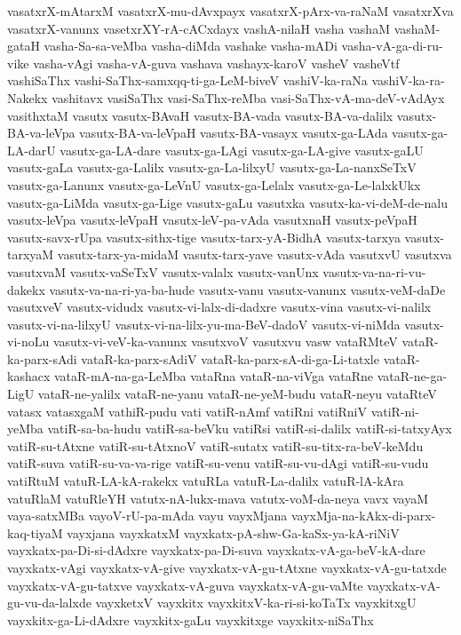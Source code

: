 {vasatxrX-mAtarxM
vasatxrX-mu-dAvxpayx
vasatxrX-pArx-va-raNaM
vasatxrXva
vasatxrX-vanunx
vasetxrXY-rA-cACxdayx
vashA-nilaH
vasha
vashaM
vashaM-gataH
vasha-Sa-sa-veMba
vasha-diMda
vashake
vasha-mADi
vasha-vA-ga-di-ru-vike
vasha-vAgi
vasha-vA-guva
vashava
vashayx-karoV
vasheV
vasheVtf
vashiSaThx
vashi-SaThx-samxqq-ti-ga-LeM-biveV
vashiV-ka-raNa
vashiV-ka-ra-Nakekx
vashitavx
vasiSaThx
vasi-SaThx-reMba
vasi-SaThx-vA-ma-deV-vAdAyx
vasithxtaM
vasutx
vasutx-BAvaH
vasutx-BA-vada
vasutx-BA-va-dalilx
vasutx-BA-va-leVpa
vasutx-BA-va-leVpaH
vasutx-BA-vasayx
vasutx-ga-LAda
vasutx-ga-LA-darU
vasutx-ga-LA-dare
vasutx-ga-LAgi
vasutx-ga-LA-give
vasutx-gaLU
vasutx-gaLa
vasutx-ga-Lalilx
vasutx-ga-La-lilxyU
vasutx-ga-La-nanxSeTxV
vasutx-ga-Lanunx
vasutx-ga-LeVnU
vasutx-ga-Lelalx
vasutx-ga-Le-lalxkUkx
vasutx-ga-LiMda
vasutx-ga-Lige
vasutx-gaLu
vasutxka
vasutx-ka-vi-deM-de-nalu
vasutx-leVpa
vasutx-leVpaH
vasutx-leV-pa-vAda
vasutxnaH
vasutx-peVpaH
vasutx-savx-rUpa
vasutx-sithx-tige
vasutx-tarx-yA-BidhA
vasutx-tarxya
vasutx-tarxyaM
vasutx-tarx-ya-midaM
vasutx-tarx-yave
vasutx-vAda
vasutxvU
vasutxva
vasutxvaM
vasutx-vaSeTxV
vasutx-valalx
vasutx-vanUnx
vasutx-va-na-ri-vu-dakekx
vasutx-va-na-ri-ya-ba-hude
vasutx-vanu
vasutx-vanunx
vasutx-veM-daDe
vasutxveV
vasutx-vidudx
vasutx-vi-lalx-di-dadxre
vasutx-vina
vasutx-vi-nalilx
vasutx-vi-na-lilxyU
vasutx-vi-na-lilx-yu-ma-BeV-dadoV
vasutx-vi-niMda
vasutx-vi-noLu
vasutx-vi-veV-ka-vanunx
vasutxvoV
vasutxvu
vasw
vataRMteV
vataR-ka-parx-sAdi
vataR-ka-parx-sAdiV
vataR-ka-parx-sA-di-ga-Li-tatxle
vataR-kashacx
vataR-mA-na-ga-LeMba
vataRna
vataR-na-viVga
vataRne
vataR-ne-ga-LigU
vataR-ne-yalilx
vataR-ne-yanu
vataR-ne-yeM-budu
vataR-neyu
vataRteV
vatasx
vatasxgaM
vathiR-pudu
vati
vatiR-nAmf
vatiRni
vatiRniV
vatiR-ni-yeMba
vatiR-sa-ba-hudu
vatiR-sa-beVku
vatiRsi
vatiR-si-dalilx
vatiR-si-tatxyAyx
vatiR-su-tAtxne
vatiR-su-tAtxnoV
vatiR-sutatx
vatiR-su-titx-ra-beV-keMdu
vatiR-suva
vatiR-su-va-va-rige
vatiR-su-venu
vatiR-su-vu-dAgi
vatiR-su-vudu
vatiRtuM
vatuR-LA-kA-rakekx
vatuRLa
vatuR-La-dalilx
vatuR-lA-kAra
vatuRlaM
vatuRleYH
vatutx-nA-lukx-mava
vatutx-voM-da-neya
vavx
vayaM
vaya-satxMBa
vayoV-rU-pa-mAda
vayu
vayxMjana
vayxMja-na-kAkx-di-parx-kaq-tiyaM
vayxjana
vayxkatxM
vayxkatx-pA-shw-Ga-kaSx-ya-kA-riNiV
vayxkatx-pa-Di-si-dAdxre
vayxkatx-pa-Di-suva
vayxkatx-vA-ga-beV-kA-dare
vayxkatx-vAgi
vayxkatx-vA-give
vayxkatx-vA-gu-tAtxne
vayxkatx-vA-gu-tatxde
vayxkatx-vA-gu-tatxve
vayxkatx-vA-guva
vayxkatx-vA-gu-vaMte
vayxkatx-vA-gu-vu-da-lalxde
vayxketxV
vayxkitx
vayxkitxV-ka-ri-si-koTaTx
vayxkitxgU
vayxkitx-ga-Li-dAdxre
vayxkitx-gaLu
vayxkitxge
vayxkitx-niSaThx
}

